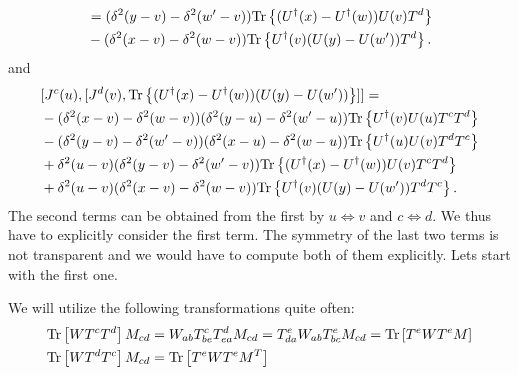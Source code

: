 \documentclass[aps,prd,amsmath,amssymb,nofootinbib]{revtex4-2}
\numberwithin{equation}{section}
\begin{document}
\begin{align}
    [J^d(v), {\rm Tr}  \left\{ (U^\dagger(x) - U^\dagger(w)) (U(y) - U(w')) \right\} ]
    & = (\delta^2(y-v) - \delta^2(w'-v)) {\rm Tr} \left\{  (U^\dagger(x) - U^\dagger(w)) U(v) T^d  \right\} \notag \\ &- (\delta^2(x-v) - \delta^2(w-v)) {\rm Tr} \left\{ U^\dagger(v)  (U(y) - U(w')) T^d  \right\} . 
\end{align}
and 
\begin{align}
    &[J^c(u) , [J^d(v), {\rm Tr}  \left\{ (U^\dagger(x) - U^\dagger(w)) (U(y) - U(w')) \right\} ]] 
     = \notag \\  
    & - (\delta^2(x-v) - \delta^2(w-v))  (\delta^2(y-u) - \delta^2(w'-u)) {\rm Tr} \left\{ U^\dagger(v)  U(u) T^c T^d  \right\}  
    \notag \\ 
    & - (\delta^2(y-v) - \delta^2(w'-v))  (\delta^2(x-u) - \delta^2(w-u)) {\rm Tr} \left\{  U^\dagger(u) U(v) T^d T^c  \right\} 
    \notag \\ 
    & + \delta^2(u-v) (\delta^2(y-v) - \delta^2(w'-v))  {\rm Tr} \left\{  (U^\dagger(x)  - U^\dagger(w) )U(v) T^c T^d  \right\} 
    \notag \\ 
    & + \delta^2(u-v) (\delta^2(x-v) - \delta^2(w-v))  {\rm Tr} \left\{  U^\dagger(v) (U(y)-U(w')) T^d T^c  \right\} . 
\end{align}
The second terms can be obtained from the first by $u \Leftrightarrow v $ and $c  \Leftrightarrow d$. We thus have to explicitly consider the first term. The symmetry of the last two terms is not transparent and we would have to compute both of them explicitly. Lets start with the first one.    

We will utilize the following transformations quite often: 
\begin{align}
    &{\rm Tr} \left [ W T^c T^d \right] M_{cd} = W_{ab} T^c_{be} T^{d}_{ea} M_{cd} = T^{e}_{da} W_{ab} T^{e}_{bc} M_{cd} = {\rm Tr} \left[ T^e W T^e M \right] \\ 
    &
    {\rm Tr} \left [ W T^d T^c \right] M_{cd} =  {\rm Tr} \left[ T^e W T^e M^T \right]
\end{align}
\end{document}
